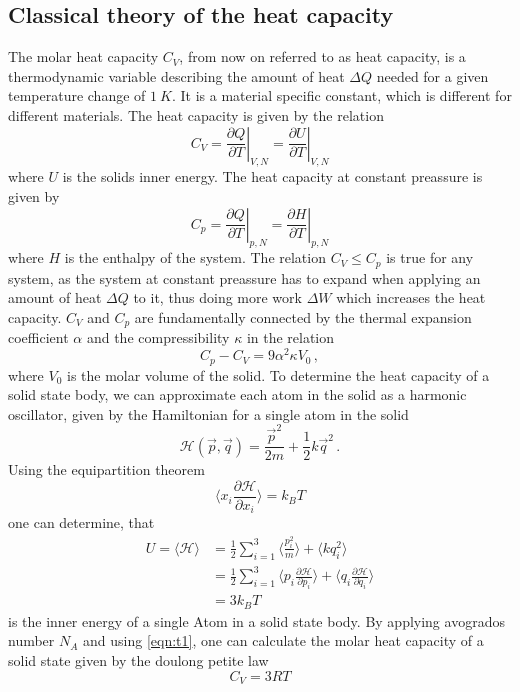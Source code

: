 \subsection{Classical theory of the heat capacity}
The molar heat capacity $C_V$, from now on referred to as heat capacity, is a thermodynamic variable describing the amount of heat $\Delta Q$ needed for a given temperature change of $\SI{1}{K}$. It is a material specific constant, which is different for different materials.
The heat capacity is given by the relation
\begin{equation}
    \label{eqn:t1}
    C_V = \left. \frac{\partial Q}{\partial T} \right|_{V, N} = \left. \frac{\partial U}{\partial T} \right|_{V, N}
\end{equation}
where $U$ is the solids inner energy. The heat capacity at constant preassure is given by
\begin{equation}
    C_p = \left. \frac{\partial Q}{\partial T} \right|_{p, N} = \left. \frac{\partial H}{\partial T} \right|_{p, N}
\end{equation}
where $H$ is the enthalpy of the system. The relation $C_V \leq C_p$ is true for any system, as the system at constant preassure has to expand when applying an amount of heat $\Delta Q$ to it, thus doing more work $\Delta W$ which increases the heat capacity.
$C_V$ and $C_p$ are fundamentally connected by the thermal expansion coefficient $\alpha$ and the compressibility $\kappa$ in the relation
\begin{equation}
    \label{eqn:t2}
    C_p - C_V = 9 \alpha^2 \kappa V_0 \, ,
\end{equation}
where $V_0$ is the molar volume of the solid.
To determine the heat capacity of a solid state body, we can approximate each atom in the solid as a harmonic oscillator, given by the Hamiltonian for a single atom in the solid 
\begin{equation}
    \mathcal{H} \left( \vec{p}, \vec{q} \right) = \frac{\vec{p}^2}{2m} + \frac{1}{2} k \vec{q}^2 \, .
\end{equation}
Using the equipartition theorem 
\begin{equation}
    \langle x_i \frac{\partial \mathcal{H}}{\partial x_i}\rangle = k_B T
\end{equation}
one can determine, that 
\begin{align}
    U = \langle \mathcal{H} \rangle &= \frac{1}{2} \sum_{i=1}^3 \langle \frac{p_i^2}{m} \rangle + \langle k q_i^2 \rangle \\
                                    &= \frac{1}{2} \sum_{i=1}^3 \langle p_i \frac{\partial \mathcal{H}}{\partial p_i} \rangle + \langle q_i \frac{\partial \mathcal{H}}{\partial q_i}\rangle \\
                                    &= 3 k_B T
\end{align}
is the inner energy of a single Atom in a solid state body.
By applying avogrados number $N_A$ and using \autoref{eqn:t1}, one can calculate the molar heat capacity of a solid state given by the doulong petite law
\begin{equation}
    C_V = 3 R T
\end{equation}
